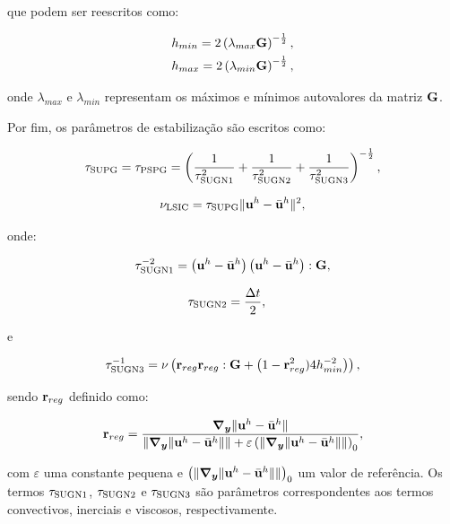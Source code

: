 \documentclass[tese_patricia]{subfiles}%
\begin{document}
\noindent que podem ser reescritos como:

\begin{align}
	h_{min} = 2\left(\lambda_{max}\mathbf{G}\right)^{-\frac{1}{2}}, \\
	h_{max} = 2\left(\lambda_{min}\mathbf{G}\right)^{-\frac{1}{2}},
\end{align}

\noindent onde $\lambda_{max}$ e $\lambda_{min}$ representam os máximos e mínimos autovalores da matriz $\mathbf{G}$. 

Por fim, os parâmetros de estabilização são escritos como:

\begin{align}
	\tau_{\mathrm{SUPG}} = \tau_{\mathrm{PSPG}} =\left(\frac{1}{\tau_{\mathrm{SUGN1}}^2} + \frac{1}{\tau_{\mathrm{SUGN2}}^2} + \frac{1}{\tau_{\mathrm{SUGN3}}^2} \right)^{-\frac{1}{2}},
\end{align}

\begin{align}
	\nu_{\mathrm{LSIC}} = \tau_{\mathrm{SUPG}} \lVert\mathbf{u}^h - \bar{\mathbf{u}}^h\rVert^2,
\end{align}

\noindent onde:

\begin{align}
	\tau_{\mathrm{SUGN1}}^{-2} = \left(\mathbf{u}^h - \bar{\mathbf{u}}^h \right) \left(\mathbf{u}^h - \bar{\mathbf{u}}^h \right) : \mathbf{G} ,
\end{align}

\begin{align}
	\tau_{\mathrm{SUGN2}}&=\frac{\Delta t}{2},
\end{align}

\noindent e

\begin{align}
	\tau_{\mathrm{SUGN3}}^{-1} = \nu \left(\mathbf{r}_{reg}\mathbf{r}_{reg} : \mathbf{G} + \left(1 - \mathbf{r}_{reg}^2)4h_{min}^{-2} \right)\right) ,
\end{align}

\noindent sendo $\mathbf{r}_{reg}$ definido como:

\begin{align}
	\mathbf{r}_{reg} =\frac{\boldsymbol{\nabla_y} \lVert\mathbf{u}^h - \bar{\mathbf{u}}^h\rVert}{\lVert \boldsymbol{\nabla_y} \lVert\mathbf{u}^h - \bar{\mathbf{u}}^h\rVert\rVert + \varepsilon\left(\lVert \boldsymbol{\nabla_y} \lVert\mathbf{u}^h - \bar{\mathbf{u}}^h\rVert\rVert\right)_0},
\end{align}

\noindent com $\varepsilon$ uma constante pequena e $\left(\lVert \boldsymbol{\nabla_y} \lVert\mathbf{u}^h- \bar{\mathbf{u}}^h\rVert\rVert\right)_0$ um valor de referência. Os termos $\tau_{\mathrm{SUGN1}}$, $\tau_{\mathrm{SUGN2}}$ e $\tau_{\mathrm{SUGN3}}$ são parâmetros correspondentes aos termos convectivos, inerciais e viscosos, respectivamente.
\end{document}
